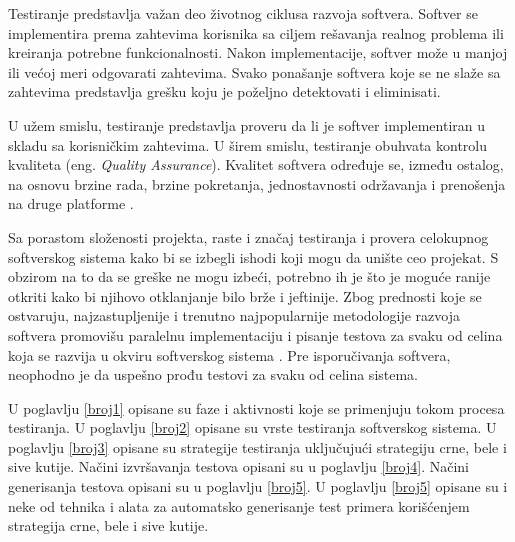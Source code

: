 \documentclass[12pt,oneside]{memoir}
\begin{document}
Testiranje predstavlja važan deo životnog ciklusa razvoja softvera. 
Softver se implementira prema zahtevima korisnika sa ciljem rešavanja realnog problema ili kreiranja potrebne funkcionalnosti. Nakon implementacije, softver može u manjoj ili većoj meri odgovarati zahtevima. Svako ponašanje softvera koje se ne slaže sa zahtevima predstavlja grešku koju je poželjno detektovati i eliminisati. 
\par
U užem smislu, testiranje predstavlja proveru da li je softver implementiran u skladu sa korisničkim zahtevima. U širem smislu, testiranje obuhvata kontrolu kvaliteta (eng. \textit{Quality Assurance}). Kvalitet softvera određuje se, između ostalog, na osnovu brzine rada, brzine pokretanja, jednostavnosti održavanja i prenošenja na druge platforme \cite{QualityAssurance}.

\par 
Sa porastom složenosti projekta, raste i značaj testiranja i provera celokupnog softverskog sistema kako bi se izbegli ishodi koji mogu da unište ceo projekat. 
S obzirom na to da se greške ne mogu izbeći, potrebno ih je što je moguće ranije otkriti kako bi njihovo otklanjanje bilo brže i jeftinije. Zbog prednosti koje se ostvaruju, najzastupljenije i trenutno najpopularnije metodologije razvoja softvera promovišu paralelnu implementaciju i pisanje testova za svaku od celina koja se razvija u okviru softverskog sistema \cite{AgileDevelopment}. Pre isporučivanja softvera, neophodno je da uspešno prođu testovi za svaku od celina sistema.
\par 

U poglavlju \ref{broj1} opisane su faze i aktivnosti koje se primenjuju tokom procesa testiranja. U poglavlju \ref{broj2} opisane su vrste testiranja softverskog sistema. U poglavlju \ref{broj3} opisane su strategije testiranja uključujući strategiju crne, bele i sive kutije. Načini izvršavanja testova opisani su u poglavlju \ref{broj4}. Načini generisanja testova opisani su u poglavlju \ref{broj5}. U poglavlju \ref{broj5} opisane su i neke od tehnika i alata za automatsko generisanje test primera korišćenjem strategija crne, bele i sive kutije. 
\end{document}
